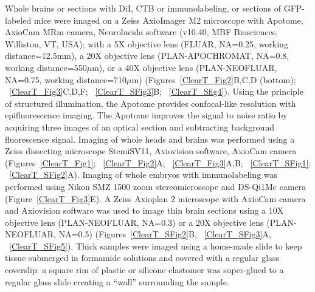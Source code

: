 Whole brains or sections with DiI, CTB or immunolabeling, or sections of GFP-labeled mice were imaged on a Zeiss AxioImager M2 microscope with Apotome, AxioCam MRm camera, Neurolucida software (v10.40, MBF Biosciences, Williston, VT, USA); with a 5X objective lens (FLUAR, NA=0.25, working distance=12.5mm), a 20X objective lens (PLAN-APOCHROMAT, NA=0.8, working distance=550$\mu$m), or a 40X objective lens (PLAN-NEOFLUAR, NA=0.75, working distance=710$\mu$m) (Figures~\ref{ClearT_Fig2}B,C,D (bottom); ~\ref{ClearT_Fig3}C,D,F; ~\ref{ClearT_SFig3}B; ~\ref{ClearT_Sfig4}).
Using the principle of structured illumination, the Apotome provides confocal-like resolution with epifluorescence imaging.
The Apotome improves the signal to noise ratio by acquiring three images of an optical section and subtracting background fluorescence signal.
Imaging of whole heads and brains was performed using a Zeiss dissecting microscope StemiSV11, Axiovision software, AxioCam camera (Figures~\ref{ClearT_Fig1}; ~\ref{ClearT_Fig2}A; ~\ref{ClearT_Fig3}A,B; ~\ref{ClearT_SFig1}; ~\ref{ClearT_SFig2}A).
Imaging of whole embryos with immunolabeling was performed using Nikon SMZ 1500 zoom stereomicroscope and DS-Qi1Mc camera (Figure~\ref{ClearT_Fig3}E).
A Zeiss Axioplan 2 microscope with AxioCam camera and Axiovision software was used to image thin brain sections using a 10X objective lens (PLAN-NEOFLUAR, NA=0.3) or a 20X objective lens (PLAN-NEOFLUAR, NA=0.5) (Figures~\ref{ClearT_SFig2}B, ~\ref{ClearT_SFig3}A, ~\ref{ClearT_SFig5}).
Thick samples were imaged using a home-made slide to keep tissue submerged in formamide solutions and covered with a regular glass coverslip: a square rim of plastic or silicone elastomer was super-glued to a regular glass slide creating a ``wall'' surrounding the sample.
